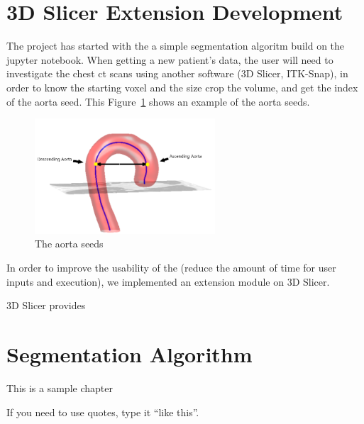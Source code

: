 \section{3D Slicer Extension Development}
The project has started with the a simple segmentation algoritm build on the jupyter notebook. When getting a new patient's data, the user will need to investigate the chest ct scans using another software (3D Slicer, ITK-Snap), in order to know the starting voxel and the size crop the volume, and get the index of the aorta seed. This Figure~\ref{fig_aorta_seed} shows an example of the aorta seeds.

\begin{figure}[ht]
    \centering
    \includegraphics[width=0.6\textwidth]{figures/Sample/Aorta_seeds.png}
    \caption[Single Figure Environment Listed Title]{The aorta seeds}
    \label{fig_aorta_seed}
\end{figure}

In order to improve the usability of the \progname{} (reduce the amount of time for user inputs and execution), we implemented an extension module on 3D Slicer. 

3D Slicer provides 

\section{Segmentation Algorithm}

This is a sample chapter

If you need to use quotes, type it ``like this''.


